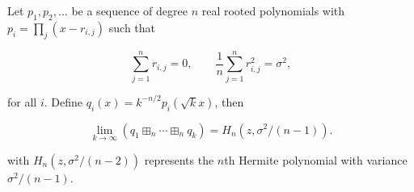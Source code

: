 \begin{theorem}
    Let $p_1, p_2, \dots$ be a sequence of degree $n$ real rooted polynomials with $p_i = \prod_j (x - r_{i,j})$ such that

    \begin{equation} \label{eq:hypotheses_ffclt}
        \sum_{j=1}^n r_{i,j} = 0, \qquad \frac1n \sum_{j=1}^n r^2_{i,j} = \sigma^2,
    \end{equation}

    \noindent for all $i$. Define $q_i(x) = k^{-n/2}p_i(\sqrt{k}x)$, then 


    \begin{equation*}
        \lim_{k\to\infty} \left( q_1 \boxplus_n \cdots \boxplus_n q_k \right) = H_n(z,\sigma^2/(n-1)).
    \end{equation*}

    \noindent with $H_n(z,\sigma^2/(n-2))$ represents the $n$th Hermite polynomial with variance $\sigma^2/(n-1)$.
\end{theorem}


